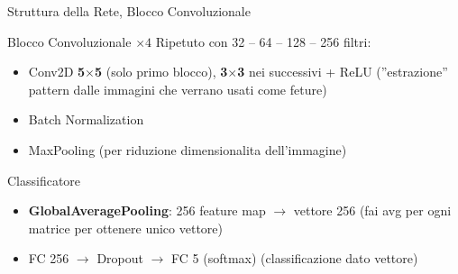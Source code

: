 \documentclass[9pt,serif,usenames,dvipsnames]{beamer}
\begin{document}
	\begin{frame}{\centering Struttura della Rete, Blocco Convoluzionale}
		\begin{block}{Blocco Convoluzionale $\times 4$}
			Ripetuto con 32 – 64 – 128 – 256 filtri:
			\begin{itemize}
				\item Conv2D \textbf{5$\times$5} (solo primo blocco),
				\textbf{3$\times$3} nei successivi + ReLU (''estrazione'' pattern dalle immagini che verrano usati come feture)
				\item Batch Normalization
				\item MaxPooling (per riduzione dimensionalita dell'immagine)
			\end{itemize}
		\end{block}

		\vspace{0.15cm}

		\begin{block}{Classificatore}
			\begin{itemize}
				\item \textbf{GlobalAveragePooling}: 256 feature map
				$\rightarrow$ vettore 256 (fai avg per ogni matrice per ottenere unico vettore)
				\item FC 256 $\rightarrow$ Dropout $\rightarrow$
				FC 5 (softmax) (classificazione dato vettore)
			\end{itemize}
		\end{block}
	\end{frame}
		
\end{document}
